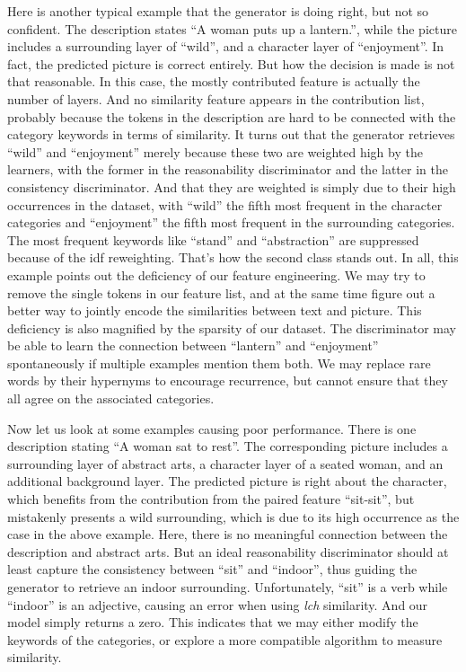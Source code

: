 \documentclass{article} %
\begin{document}
Here is another typical example that the generator is doing right, but not so confident. The description states ``A woman puts up a lantern.'', while the picture includes a surrounding layer of ``wild'', and a character layer of ``enjoyment''. In fact, the predicted picture is correct entirely. But how the decision is made is not that reasonable. In this case, the mostly contributed feature is actually the number of layers. And no similarity feature appears in the contribution list, probably because the tokens in the description are hard to be connected with the category keywords in terms of similarity. It turns out that the generator retrieves ``wild'' and ``enjoyment'' merely because these two are weighted high by the learners, with the former in the reasonability discriminator and the latter in the consistency discriminator. And that they are weighted is simply due to their high occurrences in the dataset, with ``wild'' the fifth most frequent in the character categories and ``enjoyment'' the fifth most frequent in the surrounding categories. The most frequent keywords like ``stand'' and ``abstraction'' are suppressed because of the idf reweighting. That's how the second class stands out. In all, this example points out the deficiency of our feature engineering. We may try to remove the single tokens in our feature list, and at the same time figure out a better way to jointly encode the similarities between text and picture. This deficiency is also magnified by the sparsity of our dataset. The discriminator may be able to learn the connection between ``lantern'' and ``enjoyment''  spontaneously if multiple examples mention them both. We may replace rare words by their hypernyms to encourage recurrence, but cannot ensure that they all agree on the associated categories.

Now let us look at some examples causing poor performance. There is one description stating ``A woman sat to rest''. The corresponding picture includes a surrounding layer of abstract arts, a character layer of a seated woman, and an additional background layer. The predicted picture is right about the character, which benefits from the contribution from the paired feature ``sit-sit'', but mistakenly presents a wild surrounding, which is due to its high occurrence as the case in the above example. Here, there is no meaningful connection between the description and abstract arts. But an ideal reasonability discriminator should at least capture the consistency between ``sit'' and ``indoor'', thus guiding the generator to retrieve an indoor surrounding. Unfortunately, ``sit'' is a verb while ``indoor'' is an adjective, causing an error when using \emph{lch} similarity. And our model simply returns a zero. This indicates that we may either modify the keywords of the categories, or explore a more compatible algorithm to measure similarity.  
\end{document}
